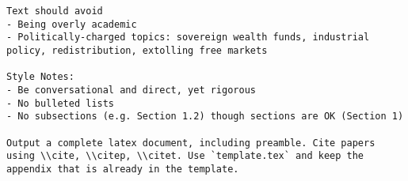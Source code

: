 \begin{lstlisting}[language=text,breaklines=true,frame=single]
Text should avoid      
- Being overly academic
- Politically-charged topics: sovereign wealth funds, industrial policy, redistribution, extolling free markets

Style Notes:
- Be conversational and direct, yet rigorous
- No bulleted lists
- No subsections (e.g. Section 1.2) though sections are OK (Section 1)      

Output a complete latex document, including preamble. Cite papers using \\cite, \\citep, \\citet. Use `template.tex` and keep the appendix that is already in the template.

\end{lstlisting}
\vspace{-3ex}
